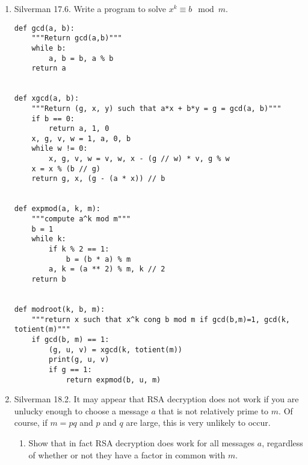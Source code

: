 \documentclass[10pt,twoside]{article}
\begin{document}
\begin{enumerate}[itemsep=2em,label=\Alph*.]
\begin{enumerate}[label=(\alph*)]


        \end{enumerate}
\pagebreak
    \item Silverman 17.6. Write a program to solve $x^k \equiv b \mod{m}$.
    
        \begin{lstlisting}
def gcd(a, b):
    """Return gcd(a,b)"""
    while b:
        a, b = b, a % b
    return a


def xgcd(a, b):
    """Return (g, x, y) such that a*x + b*y = g = gcd(a, b)"""
    if b == 0:
        return a, 1, 0
    x, g, v, w = 1, a, 0, b
    while w != 0:
        x, g, v, w = v, w, x - (g // w) * v, g % w
    x = x % (b // g)
    return g, x, (g - (a * x)) // b

        
def expmod(a, k, m):
    """compute a^k mod m"""
    b = 1
    while k:
        if k % 2 == 1:
            b = (b * a) % m
        a, k = (a ** 2) % m, k // 2
    return b

        
def modroot(k, b, m):
    """return x such that x^k cong b mod m if gcd(b,m)=1, gcd(k, totient(m)"""
    if gcd(b, m) == 1:
        (g, u, v) = xgcd(k, totient(m))
        print(g, u, v)
        if g == 1:
            return expmod(b, u, m)
        \end{lstlisting}

\pagebreak
    \item Silverman 18.2. It may appear that RSA decryption does not work if you are unlucky enough to choose a message $a$ that is not relatively prime to $m$. Of course, if $m =pq$ and $p$ and $q$ are large, this is very unlikely to occur.
        \begin{enumerate}[label=(\alph*)]
            \item Show that in fact RSA decryption does work for all messages $a$, regardless of whether or not they have a factor in common with $m$. 
    

\end{enumerate}
\end{enumerate}
\end{document}
